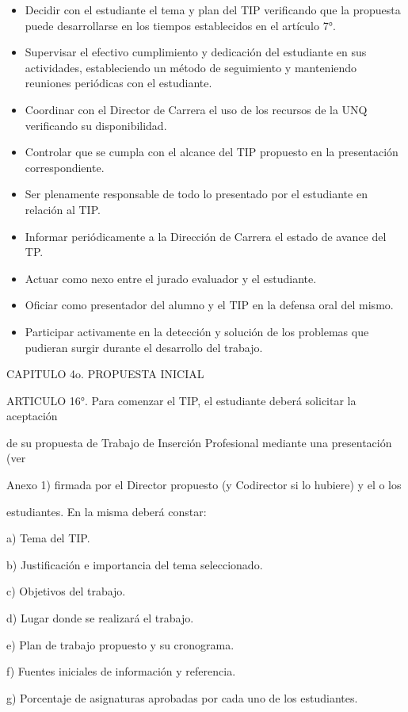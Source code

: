 \documentclass[a4paper,12pt]{article}
\begin{document}
\begin{itemize}
 \item Decidir con el estudiante el tema y plan del TIP verificando que la
 propuesta puede desarrollarse en los tiempos establecidos en el
 artículo 7°.
 \item Supervisar el efectivo cumplimiento y dedicación del estudiante en
 sus actividades, estableciendo un método de seguimiento y
 manteniendo reuniones periódicas con el estudiante.
 \item Coordinar con el Director de Carrera el uso de los recursos de la
 UNQ verificando su disponibilidad.
 \item Controlar que se cumpla con el alcance del TIP propuesto en la
 presentación correspondiente.
 \item Ser plenamente responsable de todo lo presentado por el
 estudiante en relación al TIP.
 \item Informar periódicamente a la Dirección de Carrera el estado de
 avance del TP.
 \item Actuar como nexo entre el jurado evaluador y el estudiante.
 \item Oficiar como presentador del alumno y el TIP en la defensa oral del
 mismo.
 \item Participar activamente en la detección y solución de los problemas
 que pudieran surgir durante el desarrollo del trabajo.
\end{itemize}


CAPITULO 4o. PROPUESTA INICIAL

ARTICULO 16°. Para comenzar el TIP, el estudiante deberá solicitar la aceptación

de su propuesta de Trabajo de Inserción Profesional mediante una presentación (ver

Anexo 1) firmada por el Director propuesto (y Codirector si lo hubiere) y el o los

estudiantes. En la misma deberá constar:

a) Tema del TIP.

b) Justificación e importancia del tema seleccionado.

c) Objetivos del trabajo.

d) Lugar donde se realizará el trabajo.

e) Plan de trabajo propuesto y su cronograma.

f) Fuentes iniciales de información y referencia.

g) Porcentaje de asignaturas aprobadas por cada uno de los estudiantes.
\end{document}
